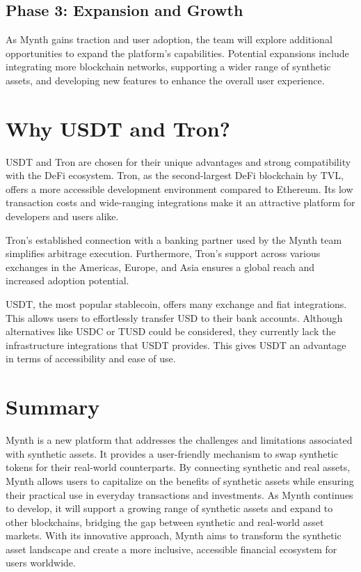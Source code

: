 \hypertarget{phase-3-expansion-and-growth}{%
\subsection{Phase 3: Expansion and
Growth}\label{phase-3-expansion-and-growth}}

As Mynth gains traction and user adoption, the team will explore
additional opportunities to expand the platform's capabilities.
Potential expansions include integrating more blockchain networks,
supporting a wider range of synthetic assets, and developing new
features to enhance the overall user experience.

\hypertarget{why-usdt-and-tron}{%
\section{Why USDT and Tron?}\label{why-usdt-and-tron}}

USDT and Tron are chosen for their unique advantages and strong
compatibility with the DeFi ecosystem. Tron, as the second-largest DeFi
blockchain by TVL, offers a more accessible development environment
compared to Ethereum. Its low transaction costs and wide-ranging
integrations make it an attractive platform for developers and users
alike.

Tron's established connection with a banking partner used by the Mynth
team simplifies arbitrage execution. Furthermore, Tron's support across
various exchanges in the Americas, Europe, and Asia ensures a global
reach and increased adoption potential.

USDT, the most popular stablecoin, offers many exchange and fiat
integrations. This allows users to effortlessly transfer USD to their
bank accounts. Although alternatives like USDC or TUSD could be
considered, they currently lack the infrastructure integrations that
USDT provides. This gives USDT an advantage in terms of accessibility
and ease of use.

\hypertarget{summary}{%
\section{Summary}\label{summary}}

Mynth is a new platform that addresses the challenges and limitations
associated with synthetic assets. It provides a user-friendly mechanism
to swap synthetic tokens for their real-world counterparts. By
connecting synthetic and real assets, Mynth allows users to capitalize
on the benefits of synthetic assets while ensuring their practical use
in everyday transactions and investments. As Mynth continues to develop,
it will support a growing range of synthetic assets and expand to other
blockchains, bridging the gap between synthetic and real-world asset
markets. With its innovative approach, Mynth aims to transform the
synthetic asset landscape and create a more inclusive, accessible
financial ecosystem for users worldwide.
